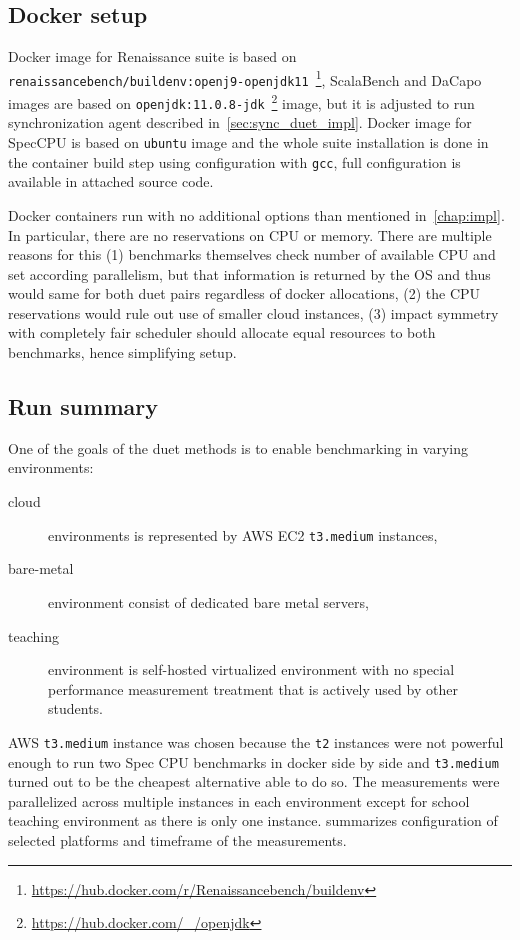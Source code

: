 \subsection{Docker setup}
Docker image for Renaissance suite is based on \lstinline{renaissancebench/buildenv:openj9-openjdk11}~\footnote{\url{https://hub.docker.com/r/Renaissancebench/buildenv}}, ScalaBench and DaCapo images are based on \lstinline{openjdk:11.0.8-jdk}~\footnote{\url{https://hub.docker.com/_/openjdk}} image, but it is adjusted to run synchronization agent described in~\cref{sec:sync_duet_impl}.
Docker image for SpecCPU is based on \lstinline{ubuntu} image and the whole suite installation is done in the container build step using configuration with \lstinline{gcc}, full configuration is available in attached source code.

Docker containers run with no additional options than mentioned in~\cref{chap:impl}.
In particular, there are no reservations on CPU or memory.
There are multiple reasons for this (1) benchmarks themselves check number of available CPU and set according parallelism, but that information is returned by the OS and thus would same for both duet pairs regardless of docker allocations, (2) the CPU reservations would rule out use of smaller cloud instances, (3) impact symmetry with completely fair scheduler should allocate equal resources to both benchmarks, hence simplifying setup.

\subsection{Run summary}

One of the goals of the duet methods is to enable benchmarking in varying environments:
\begin{description}
	\item[cloud] environments is represented by AWS EC2 \lstinline{t3.medium} instances,
	\item[bare-metal] environment consist of dedicated bare metal servers,
	\item[teaching] environment is self-hosted virtualized environment with no special performance measurement treatment that is actively used by other students.
\end{description}
AWS \lstinline{t3.medium} instance was chosen because the \lstinline{t2} instances were not powerful enough to run two Spec CPU benchmarks in docker side by side and \lstinline{t3.medium} turned out to be the cheapest alternative able to do so.
The measurements were parallelized across multiple instances in each environment except for school teaching environment as there is only one instance.
 summarizes configuration of selected platforms and timeframe of the measurements.


